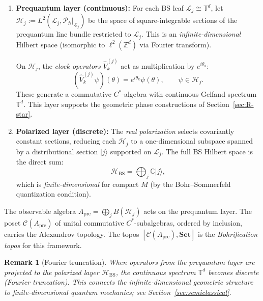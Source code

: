 \documentclass[11pt]{article}
\newtheorem{remark}[theorem]{Remark}
\begin{document}
\begin{enumerate}
\item \textbf{Prequantum layer (continuous):} For each BS leaf $\mathcal{L}_j \cong \mathbb{T}^d$,
let $\mathcal{H}_j := L^2(\mathcal{L}_j, \mathcal{P}_\hbar|_{\mathcal{L}_j})$
be the space of square-integrable sections of the prequantum line bundle
restricted to $\mathcal{L}_j$. This is an \emph{infinite-dimensional}
Hilbert space (isomorphic to $\ell^2(\mathbb{Z}^d)$ via Fourier transform).

On $\mathcal{H}_j$, the \emph{clock operators} $\hat{V}_k^{(j)}$ act as
multiplication by $e^{i\theta_k}$:
\[
  (\hat{V}_k^{(j)} \psi)(\theta) = e^{i\theta_k} \psi(\theta), \qquad \psi \in \mathcal{H}_j.
\]
These generate a commutative $C^*$-algebra with continuous Gelfand spectrum
$\mathbb{T}^d$. This layer supports the geometric phase constructions
of Section~\ref{sec:R-star}.

\item \textbf{Polarized layer (discrete):} The \emph{real polarization}
selects covariantly constant sections, reducing each $\mathcal{H}_j$ to a
one-dimensional subspace spanned by a distributional section $|j\rangle$
supported on $\mathcal{L}_j$. The full BS Hilbert space is the direct sum:
\[
  \mathcal{H}_{\mathrm{BS}} = \bigoplus_{j} \mathbb{C}|j\rangle,
\]
which is \emph{finite-dimensional} for compact $M$ (by the Bohr--Sommerfeld
quantization condition).
\end{enumerate}

The observable algebra $A_{\mathrm{pre}} = \bigoplus_j B(\mathcal{H}_j)$
acts on the prequantum layer. The poset $\mathcal{C}(A_{\mathrm{pre}})$
of unital commutative $C^*$-subalgebras, ordered by inclusion, carries
the Alexandrov topology. The topos $[\mathcal{C}(A_{\mathrm{pre}}), \mathbf{Set}]$
is the \emph{Bohrification topos} for this framework.

\begin{remark}[Fourier truncation]
When operators from the prequantum layer are projected to the polarized
layer $\mathcal{H}_{\mathrm{BS}}$, the continuous spectrum $\mathbb{T}^d$
becomes discrete (Fourier truncation). This connects the infinite-dimensional
geometric structure to finite-dimensional quantum mechanics; see Section~\ref{sec:semiclassical}.
\end{remark}
\end{document}
